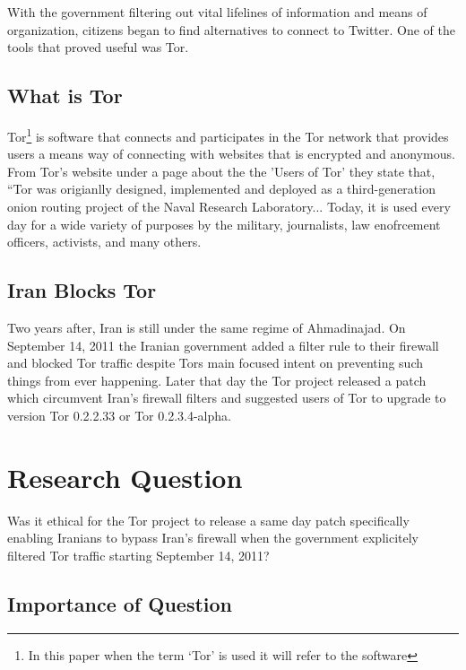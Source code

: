 \documentclass[11pt]{article}
\begin{document}
\begin{multicols}{2}
With the government filtering out vital lifelines of information and means of
organization, citizens began to find alternatives to connect to Twitter. One of
the tools that proved useful was Tor.

\subsection{What is Tor}

Tor\footnote{In this paper when the term `Tor' is used it will refer to the
software} is software that connects and participates in the Tor network that
provides users a means way of connecting with websites that is encrypted and
anonymous. From Tor's website under a page about the the 'Users of Tor' they
state that, ``Tor was origianlly designed, implemented and deployed as a
third-generation onion routing project of the Naval Research Laboratory...
Today, it is used every day for a wide variety of purposes by the military,
journalists, law enofrcement officers, activists, and many others.

\subsection{Iran Blocks Tor}

Two years after, Iran is still under the same regime of Ahmadinajad.  On
September 14, 2011 the Iranian government added a filter rule to their firewall
and blocked Tor traffic despite Tors main focused intent on preventing such
things from ever happening. \cite{IranBlocksTorSameDayFix}  Later that day the
Tor project released a patch which circumvent Iran's firewall filters and
suggested users of Tor to upgrade to version Tor 0.2.2.33 or Tor 0.2.3.4-alpha.
\cite{IranBlocksTorSameDayFix}






\section{Research Question} 
Was it ethical for the Tor project to release a same day patch specifically
enabling Iranians to bypass Iran's firewall when the government explicitely
filtered Tor traffic starting September 14, 2011?

\subsection{Importance of Question}


\end{multicols}
\end{document}

